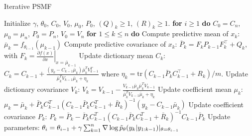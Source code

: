 \documentclass{mldsmsc}
\begin{document}
\begin{algorithm}[h]
\caption{Iterative PSMF}
\begin{algorithmic}[1]
\State Initialize $\gamma$, $\theta_0$, $C_0$, $V_0$, $\mu_0$, $P_0$, $(Q)_k{\geq1}$, $(R)_k{\geq1}$.
\State \textbf{for} $i \geq 1$ \textbf{do}
\State \hspace{1em} $C_0 = C_n$, $\mu_0 = \mu_n$, $P_0 = P_n$, $V_0 = V_n$
\State \hspace{1em} \textbf{for} $1 \leq k \leq n$ \textbf{do}
\State \hspace{2em} Compute predictive mean of $x_k$:
\State \hspace{3em} $\bar{\mu}_k = f_{\theta_{i-1}}(\mu_{k-1})$
\State \hspace{2em} Compute predictive covariance of $x_k$:
\State \hspace{3em} $\bar{P}_k = F_k P_{k-1} F_k^\top + Q_k$, with $F_k = \left. \frac{\partial f(x)}{\partial x} \right|_{x=\bar{\mu}_{k-1}}$
\State \hspace{2em} Update dictionary mean $C_k$:
\State \hspace{3em} $C_k = C_{k-1} + \frac{(y_k - C_{k-1} \bar{\mu}_k) \bar{\mu}_k^T V_{k-1}^T}{\bar{\mu}_k^T V_{k-1} \bar{\mu}_k + \eta_k}$
\State \hspace{2em} where $\eta_k = \text{tr}(C_{k-1} \bar{P}_k C_{k-1}^\top + R_{k}) / m$.
\State \hspace{2em} Update dictionary covariance $V_k$:
\State \hspace{3em} $V_k = V_{k-1} - \frac{V_{k-1} \bar{\mu}_k \bar{\mu}_k^T V_{k-1}}{\bar{\mu}_k^T V_{k-1} \bar{\mu}_k + \eta_k}$
\State \hspace{2em} Update coefficient mean $\mu_k$:
\State \hspace{3em} $\mu_k = \bar{\mu}_k + \bar{P}_k C_{k-1}^T (C_{k-1} \bar{P}_k C_{k-1}^T + \bar{R}_k)^{-1} (y_k - C_{k-1} \bar{\mu}_k)$
\State \hspace{2em} Update coefficient covariance $P_k$:
\State \hspace{3em} $P_k = \bar{P}_k - \bar{P}_k C_{k-1}^T (C_{k-1} \bar{P}_k C_{k-1}^T + \bar{R}_k)^{-1} C_{k-1} \bar{P}_k$
\State \hspace{1em} Update parameters:
\State \hspace{2em} $\theta_i = \theta_{i-1} + \gamma \sum_{k=1}^n \nabla \log \Tilde{p}_{\theta}(y_k | y_{1:k-1}) \vert_{\theta = \theta_{i-1}}$
\end{algorithmic}\label{algo:1}
\end{algorithm}
\end{document}
